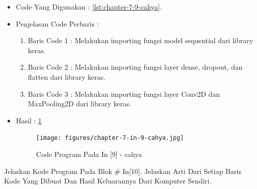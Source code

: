 \begin{itemize}
\item Code Yang Digunakan : \ref{lst:chapter-7-9-cahya}.

\par
\par
\item Penjelasan Code Perbaris	: 
\begin{enumerate}
\item Baris Code 1	: Melakukan importing fungsi model sequential dari library keras.
\item Baris Code 2	: Melakukan importing fungsi layer dense, dropout, dan flatten dari library keras.
\item Baris Code 3	: Melakukan importing fungsi layer Conv2D dan MaxPooling2D dari library keras.
\end{enumerate}
\par
\item Hasil : \ref{chapter-7-in-9-cahya}
\par
\par
\begin{figure}[!hbtp]
\centering
\texttt{[image: figures/chapter-7-in-9-cahya.jpg]}
\caption{Code Program Pada In [9] - cahya}
\label{chapter-7-in-9-cahya}
\end{figure}
\par
\par
\end{itemize}
\par
\par
\par
\item Jelaskan Kode Program Pada Blok \# In[10]. Jelaskan Arti Dari Setiap Baris Kode Yang Dibuat Dan Hasil Keluarannya Dari Komputer Sendiri.
